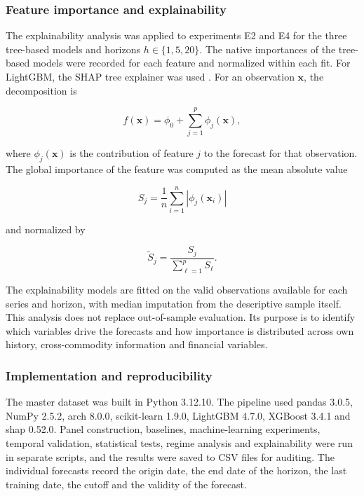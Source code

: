 \documentclass[a4paper,fleqn]{cas-sc}
\begin{document}
\subsubsection{Feature importance and explainability}
\label{subsec:explainability}

The explainability analysis was applied to experiments E2 and E4 for the three tree-based models and horizons \(h\in\{1,5,20\}\). The native importances of the tree-based models were recorded for each feature and normalized within each fit. For LightGBM, the SHAP tree explainer was used \citep{LundbergLee2017SHAP}. For an observation \(\mathbf{x}\), the decomposition is

\begin{equation}
f(\mathbf{x})
=
\phi_{0}
+\sum_{j=1}^{p}\phi_{j}(\mathbf{x}),
\label{eq:shap_decomposition}
\end{equation}

where \(\phi_j(\mathbf{x})\) is the contribution of feature \(j\) to the forecast for that observation. The global importance of the feature was computed as the mean absolute value

\begin{equation}
S_j
=
\frac{1}{n}\sum_{i=1}^{n}
\left\lvert\phi_j(\mathbf{x}_i)\right\rvert
\label{eq:shap_global}
\end{equation}

and normalized by

\begin{equation}
\widetilde{S}_j
=
\frac{S_j}{\sum_{\ell=1}^{p}S_{\ell}}.
\label{eq:shap_normalized}
\end{equation}

The explainability models are fitted on the valid observations available for each series and horizon, with median imputation from the descriptive sample itself. This analysis does not replace out-of-sample evaluation. Its purpose is to identify which variables drive the forecasts and how importance is distributed across own history, cross-commodity information and financial variables.

\subsubsection{Implementation and reproducibility}
\label{subsec:reproducibility}

The master dataset was built in Python 3.12.10. The pipeline used pandas 3.0.5, NumPy 2.5.2, arch 8.0.0, scikit-learn 1.9.0, LightGBM 4.7.0, XGBoost 3.4.1 and shap 0.52.0. Panel construction, baselines, machine-learning experiments, temporal validation, statistical tests, regime analysis and explainability were run in separate scripts, and the results were saved to CSV files for auditing. The individual forecasts record the origin date, the end date of the horizon, the last training date, the cutoff and the validity of the forecast.
\end{document}
